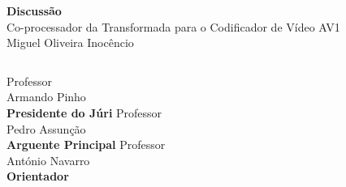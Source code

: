 \documentclass{beamer}
\begin{document}
\begin{frame}[standout,c]
       \begin{center}
              \Huge \textbf{Discussão}\\ \vspace{1cm}
              \Large Co-processador da Transformada para o Codificador de Vídeo AV1 \\ \vspace{.5cm}
              \large Miguel Oliveira Inocêncio      \\ \vspace{1.5cm}
              \begin{columns}
                            \centering
                            \large Professor\\
                            \large Armando Pinho\\
                            \small \textbf{Presidente do Júri}
                            \centering
                            \large Professor\\
                            \large Pedro Assunção\\
                            \small \textbf{Arguente Principal}
                            \centering
                            \large Professor\\
                            \large António Navarro\\
                            \small \textbf{Orientador}
              \end{columns}
       \end{center}
\end{frame}

\note{
       \begin{itemize}[label=$\bullet$]
              \item 
       \end{itemize}
}
\end{document}
